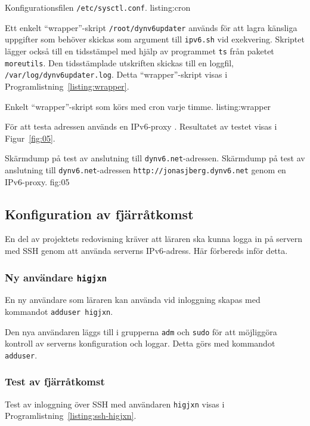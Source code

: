              {Konfigurationsfilen \texttt{/etc/sysctl.conf}.}
             {listing:cron}


Ett enkelt ``wrapper''-skript \texttt{/root/dynv6updater} används för att lagra
känsliga uppgifter som behöver skickas som argument till \texttt{ipv6.sh} vid
exekvering.  Skriptet lägger också till en tidsstämpel med hjälp av programmet
\texttt{ts} från paketet \texttt{moreutils}. Den tidsstämplade utskriften skickas
till en loggfil, \texttt{/var/log/dynv6updater.log}.
Detta ``wrapper''-skript visas i Programlistning~\ref{listing:wrapper}.

            {Enkelt ``wrapper''-skript som körs med cron varje timme.}
            {listing:wrapper}


För att testa adressen används en IPv6-proxy \cite{ipv6:ipv6proxy}.
Resultatet av testet visas i Figur~\ref{fig:05}.

           {Skärmdump på test av anslutning till \texttt{dynv6.net}-adressen.}
           {Skärmdump på test av anslutning till \texttt{dynv6.net}-adressen 
					  \texttt{http://jonasjberg.dynv6.net} genom en IPv6-proxy.}
           {fig:05}


\subsection{Konfiguration av fjärråtkomst}
En del av projektets redovisning kräver att läraren ska kunna logga in på servern
med SSH genom att använda serverns IPv6-adress. Här förbereds inför detta.


\subsubsection{Ny användare \texttt{higjxn}}
En ny användare som läraren kan använda vid inloggning skapas med kommandot
\texttt{adduser higjxn}.

Den nya användaren läggs till i grupperna \texttt{adm} och \texttt{sudo} för
att möjliggöra kontroll av serverns konfiguration och loggar. Detta görs med
kommandot \texttt{adduser}.


\subsubsection{Test av fjärråtkomst}
Test av inloggning över SSH med användaren \texttt{higjxn} visas i
Programlistning~\ref{listing:ssh-higjxn}.

